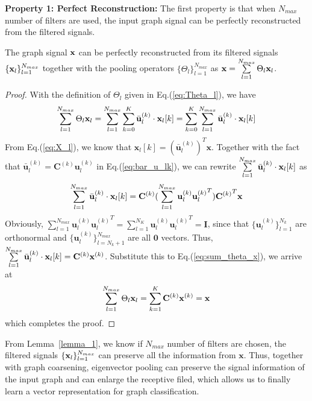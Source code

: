 \documentclass[sigconf]{acmart}
\begin{document}
\vspace{0.5em}
\noindent{}\textbf{Property 1: Perfect Reconstruction:} The first property is that when $N_{max}$ number of filters are used, the input graph signal can be perfectly reconstructed from the filtered signals.
\begin{lemma} \label{lemma_1}
The graph signal ${\bf x}$ can be perfectly reconstructed from its filtered signals $\{{\bf x}_l\}_{l=1}^{N_{max}}$ together with the pooling operators $\{ \Theta_l\}_{l=1}^{N_{max}}$ as $\mathbf{x} = \sum\limits_{l=1}^{N_{max}}  \Theta_l {\bf x}_l$.
\end{lemma}
\vspace{-1em}
\begin{proof}
With the definition of $\Theta_l$ given in Eq.(\ref{eq:Theta_l}), we have
\begin{equation} \label{eq:sum_theta_x}
  \sum\limits_{l=1}^{N_{max}}  \Theta_l {\bf x}_l = \sum\limits_{l=1}^{N_{max}} \sum\limits_{k=0}^K \bar{\bf u}^{(k)}_l \cdot {\bf x}_l[k] = \sum\limits_{k=0}^K \sum\limits_{l=1}^{N_{max}}  \bar{\bf u}^{(k)}_l \cdot {\bf x}_l[k]
\end{equation}
From Eq.(\ref{eq:X_l}), we know that $\mathbf{x}_l[k] = ({\bar{\mathbf{u}}_l^{(k)}})^T \mathbf{x}$. Together with the fact that $\bar{\mathbf{u}}_l^{(k)} = \mathbf{C}^{(k)}\mathbf{u}_l^{(k)}$ in Eq.(\ref{eq:bar_u_lk}), we can rewrite  $\sum\limits_{l=1}^{N_{max}}  \bar{\bf u}^{(k)}_l \cdot {\bf x}_l[k]$ as 
\begin{equation}
    \sum\limits_{l=1}^{N_{max}}  \bar{\bf u}^{(k)}_l \cdot {\bf x}_l[k] =  \mathbf{C}^{(k)} (\sum_{l=1}^{N_{max}} \mathbf{u}_l^{(k)} {\mathbf{u}_l^{(k)}}^T) {\mathbf{C}^{(k)}}^T \mathbf{x}
\end{equation}
Obviously, $\sum_{l=1}^{N_{max}} \mathbf{u}_l^{(k)} {\mathbf{u}_l^{(k)}}^T = \sum_{l=1}^{N_{K}} \mathbf{u}_l^{(k)} {\mathbf{u}_l^{(k)}}^T = \mathbf{I}$, since that $\{ \mathbf{u}_l^{(k)} \}_{l=1}^{N_k}$ are orthonormal and $\{\mathbf{u}_l^{(k)}\}_{l=N_k+1}^{N_{max}}$ are all $\mathbf{0}$ vectors. Thus, $   \sum\limits_{l=1}^{N_{max}}  \bar{\bf u}^{(k)}_l \cdot {\bf x}_l[k] = \mathbf{C}^{(k)} \mathbf{x}^{(k)}$. Substitute this to Eq.(\ref{eq:sum_theta_x}), we arrive at
\begin{equation}
    \sum\limits_{l=1}^{N_{max}}  \Theta_l {\bf x}_l = \sum_{k=1}^{K} \mathbf{C}^{(k)} \mathbf{x}^{(k)} = \mathbf{x}
\end{equation}
which completes the proof.

\end{proof}
From Lemma~\ref{lemma_1}, we know if $N_{max}$ number of filters are chosen, the filtered signals $\{ {\bf x}_l\}_{l=1}^{N_{max} }$ can preserve all the information from $\mathbf{x}$. Thus, together with graph coarsening, eigenvector pooling can preserve the signal information of the input graph and can enlarge the receptive filed, which allows us to finally learn a vector representation for graph classification. 
\end{document}
